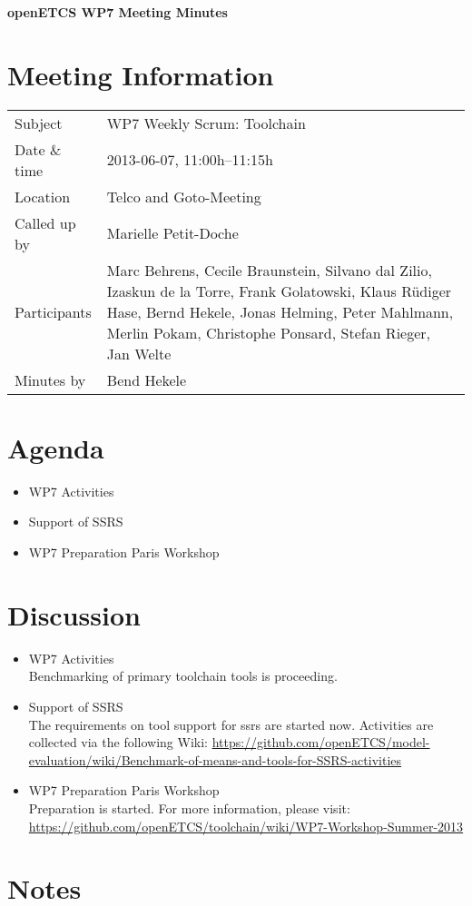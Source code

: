 \documentclass[a4paper, 11pt]{article}
\begin{document}
{\begin{center}\huge\bf openETCS WP7 Meeting Minutes\end{center}}
\section{Meeting Information}

\renewcommand{\arraystretch}{1.5}
\begin{supertabular}{m{.2\textwidth}m{.8\textwidth}}
Subject & WP7 Weekly Scrum: Toolchain\\
Date \& time & 2013-06-07, 11:00h--11:15h\\
Location & Telco and Goto-Meeting\\
Called up by & Marielle Petit-Doche\\
Participants &
Marc Behrens,
Cecile Braunstein,
Silvano dal Zilio,
Izaskun de la Torre,
Frank Golatowski,
Klaus R\"udiger Hase,
Bernd Hekele,
Jonas Helming,
Peter Mahlmann,
Merlin Pokam,
Christophe Ponsard,
Stefan Rieger,
Jan Welte\\

Minutes by & Bend Hekele\\

\end{supertabular}
\renewcommand{\arraystretch}{1.0}


\section{Agenda}
\begin{itemize}
\item WP7 Activities
\item Support of SSRS
\item WP7 Preparation Paris Workshop
\end{itemize}

\section{Discussion}

\begin{itemize}
\item WP7 Activities\\
Benchmarking of primary toolchain tools is proceeding.

\item Support of SSRS\\
The requirements on tool support for ssrs are started now. Activities are collected via the following Wiki:
\url{https://github.com/openETCS/model-evaluation/wiki/Benchmark-of-means-and-tools-for-SSRS-activities}
\item WP7 Preparation Paris Workshop\\
Preparation is started. For more information, please
visit:\\
\url{https://github.com/openETCS/toolchain/wiki/WP7-Workshop-Summer-2013}

\end{itemize}

\section{Notes}
\end{document}
